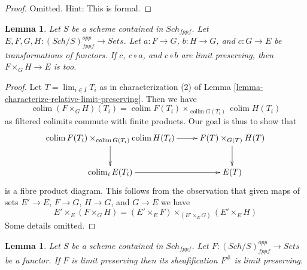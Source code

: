 \documentclass{stacks-project}
\theoremstyle{plain}
\newtheorem{lemma}[subsection]{Lemma}
\theoremstyle{definition}
\theoremstyle{remark}
\numberwithin{equation}{subsection}
\def\lim{\mathop{\mathrm{lim}}\nolimits}
\def\colim{\mathop{\mathrm{colim}}\nolimits}
\def\Sch{\mathit{Sch}}
\begin{document}
\begin{proof}
Omitted. Hint: This is formal.
\end{proof}

\begin{lemma}
\label{lemma-fibre-product-locally-finite-presentation}
Let $S$ be a scheme contained in $\Sch_{fppf}$.
Let $E, F, G, H : (\Sch/S)_{fppf}^{opp} \to \textit{Sets}$.
Let $a : F \to G$, $b : H \to G$, and $c : G \to E$
be transformations of functors. If $c$, $c \circ a$, and $c \circ b$
are limit preserving, then $F \times_G H \to E$ is too.
\end{lemma}

\begin{proof}
Let $T = \lim_{i \in I} T_i$ as in characterization (2) of
Lemma \ref{lemma-characterize-relative-limit-preserving}.
Then we have
$$
\colim (F \times_G H)(T_i) =
\colim F(T_i) \times_{\colim G(T_i)} \colim H(T_i)
$$
as filtered colimits commute with finite products. Our goal is thus to
show that
$$
\xymatrix{
\colim F(T_i) \times_{\colim G(T_i)} \colim H(T_i) \ar[r] \ar[d] &
F(T) \times_{G(T)} H(T) \ar[d] \\
\colim_i E(T_i) \ar[r] & E(T)
}
$$
is a fibre product diagram. This follows from the observation that
given maps of sets $E' \to E$, $F \to G$, $H \to G$, and $G \to E$
we have
$$
E' \times_E (F \times_G H) =
(E' \times_E F) \times_{(E' \times_E G)} (E' \times_E H)
$$
Some details omitted.
\end{proof}

\begin{lemma}
\label{lemma-sheafify-finite-presentation}
Let $S$ be a scheme contained in $\Sch_{fppf}$.
Let $F : (\Sch/S)_{fppf}^{opp} \to \textit{Sets}$ be a functor.
If $F$ is limit preserving then its sheafification $F^\#$ is limit preserving.
\end{lemma}
\end{document}
